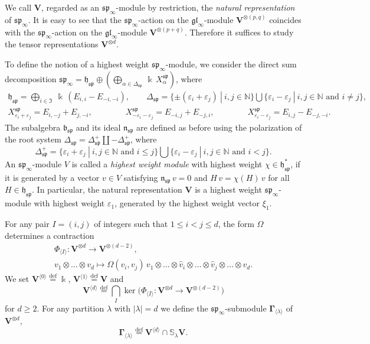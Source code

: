 \documentclass[12pt,reqno]{amsart}
\numberwithin{equation}{section}
\theoremstyle{plain}
\theoremstyle{definition}
\def\N{\mathbb N}
\def\eps{\varepsilon}
\def\bydef{\overset{\mathrm {def}}=}
\def\gl{\mathfrak{gl}}
\def\sp{\mathfrak{sp}}
\def\a{\alpha}
\def\o{\otimes}
\def\b{\mathfrak b}
\def\h{\mathfrak h}
\def\n{\mathfrak n}
\def\spV_#1{\boldsymbol\Gamma_{\<#1\>}}
\def\VV{\mathbf V}
\def\<{\langle}
\def\>{\rangle}
\def\({\left(}
\def\){\right)}
\begin{document}
We call $\VV$, regarded as an $\sp_\infty$-module by restriction,
the {\it natural representation} of $\sp_\infty$. It is easy to see that the $\sp_\infty$-action on the  $\gl_\infty$-module $\VV^{\o(p,q)}$ coincides with the $\sp_\infty$-action on the $\gl_\infty$-module $\VV^{\o(p+q)}$. Therefore it suffices to study the tensor representations $\VV^{\o d}$.

To define the notion of a highest weight $\sp_\infty$-module, we
consider the direct sum decomposition $\sp_\infty = \h_\sp
\oplus \(\bigoplus_{\a \in \Delta_{\sp}} \, \Bbbk \, X_\a^{\sp}\)$,
where
\begin{gather*}
    \h_\sp = \bigoplus_{i \in \mathfrak I} \ \Bbbk \, (E_{i,i} - E_{-i,-i}),
    \qquad
    \Delta_\sp = \{ \pm(\eps_i+\eps_j) \ | \ i,j \in \N  \} \bigcup
    \{ \eps_i-\eps_j \ | \ i,j \in \N \text{ and } i \ne j \},
    \\
    X_{\eps_i+\eps_j}^{\sp} = E_{i, -j} + E_{j, -i},
    \qquad\qquad
    X_{-\eps_i-\eps_j}^{\sp} = E_{-i,j} + E_{-j,i},
    \qquad\qquad
    X_{\eps_i-\eps_j}^{\sp} = E_{i,j} - E_{-j, -i}.
\end{gather*}
The subalgebra $\b_\sp$ and its ideal $\n_\sp$ are defined as
before using the polarization of the root system $\Delta_\sp =
\Delta_\sp^+ \coprod -\Delta_\sp^+$, where
\begin{equation*}
    \Delta_\sp^+ = \{ \eps_i+\eps_j \ | \ i,j \in \N \text{ and } i \le j \} \bigcup
    \{ \eps_i-\eps_j \ | \ i,j \in \N \text{ and } i < j \}.
\end{equation*}
An $\sp_\infty$-module $V$ is called a {\it highest weight module} with
highest weight $\chi \in \h_\sp^*$, if it is generated by a vector
$v\in V$ satisfying $\n_\sp \, v = 0$ and $H \, v = \chi(H)\, v$ for
all $H \in \h_\sp$. In particular, the natural representation $\VV$
is a highest weight $\sp_\infty$-module with highest weight $\eps_1$, generated
by the highest weight vector $\xi_1$.

\medskip

For any pair $I = (i,j)$ of integers such that $1 \le i < j
\le d$, the form $\Omega$ determines a contraction
\begin{equation*}
\begin{gathered}
    \Phi_{\<I\>}: \VV^{\o d} \to \VV^{\o (d-2)},\\
    v_1 \o \dots \o v_d \mapsto \Omega(v_{i},v_{j}) \, v_1 \o \dots \o \hat
    v_{i} \o \dots \o \hat v_{j} \o \dots \o v_d.
\end{gathered}
\end{equation*}
We set $\VV^{\<0\>}  \bydef \Bbbk$, $\VV^{\<1\>} \bydef \VV$ and
\begin{equation*}
    \VV^{\<d\>} \bydef \bigcap_{I} \ker
    \biggr( \Phi_{\<I\>}: \VV^{\o d} \to
    \VV^{\o(d-2)}\biggr)
\end{equation*}
for $d\ge
2$. For any partition $\lambda$ with $|\lambda|=d$ we define the
$\sp_\infty$-submodule $\spV_{\lambda}$ of $\VV^{\o d}$,
\begin{equation*}
    \spV_{\lambda} \bydef  \VV^{\<d\>} \cap \mathbb S_\lambda \VV.
\end{equation*}
\end{document}
